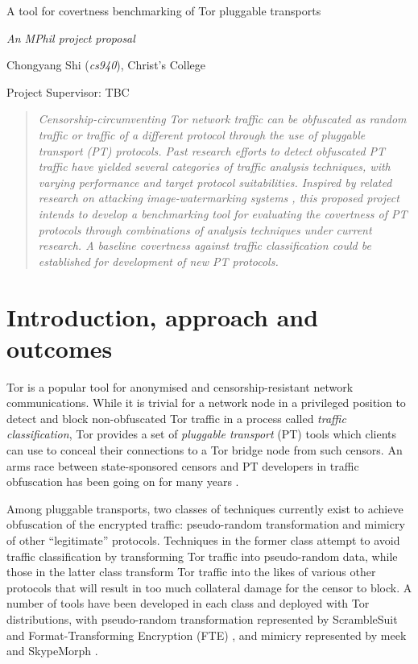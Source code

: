 \documentclass[11pt]{article}
\begin{document}
\centerline{\Large A tool for covertness benchmarking of Tor pluggable transports}
\vspace{2em}
\centerline{\Large \emph{An MPhil project proposal}}
\vspace{2em}
\centerline{\large Chongyang Shi (\emph{cs940}), Christ's College}
\vspace{1em}
\centerline{\large Project Supervisor: TBC}
\vspace{1em}

\begin{abstract}
\textsl{Censorship-circumventing Tor network traffic can be obfuscated as random traffic or traffic of a different protocol through the use of pluggable transport (PT) protocols. Past research efforts to detect obfuscated PT traffic have yielded several categories of traffic analysis techniques, with varying performance and target protocol suitabilities. Inspired by related research on attacking image-watermarking systems \cite{petitcolas1998attacks}, this proposed project intends to develop a benchmarking tool for evaluating the covertness of PT protocols through combinations of analysis techniques under current research. A baseline covertness against traffic classification could be established for development of new PT protocols.} 
\end{abstract}

\section{Introduction, approach and outcomes}

Tor is a popular tool for anonymised and censorship-resistant network communications. While it is trivial for a network node in a privileged position to detect and block non-obfuscated Tor traffic \cite[Tb. 6] {bujlow2015independent} in a process called \emph{traffic classification}, Tor provides a set of \emph{pluggable transport} (PT) tools which clients can use to conceal their connections to a Tor bridge node from such censors. An arms race between state-sponsored censors and PT developers in traffic obfuscation has been going on for many years \cite{khattak2014systemization}. 

Among pluggable transports, two classes of techniques currently exist to achieve obfuscation of the encrypted traffic: pseudo-random transformation and mimicry of other ``legitimate'' protocols. Techniques in the former class attempt to avoid traffic classification by transforming Tor traffic into pseudo-random data, while those in the latter class transform Tor traffic into the likes of various other protocols that will result in too much collateral damage for the censor to block. A number of tools have been developed in each class and deployed with Tor distributions, with pseudo-random transformation represented by ScrambleSuit \cite{winter2013scramblesuit} and Format-Transforming Encryption (FTE) \cite{dyer2013protocol}, and mimicry represented by meek \cite{fifield2015blocking} and SkypeMorph \cite{mohajeri2012skypemorph}. 
\end{document}
